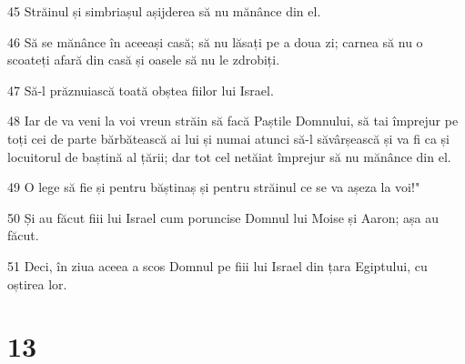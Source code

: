 \par 45 Străinul și simbriașul așijderea să nu mănânce din el.
\par 46 Să se mănânce în aceeași casă; să nu lăsați pe a doua zi; carnea să nu o scoateți afară din casă și oasele să nu le zdrobiți.
\par 47 Să-l prăznuiască toată obștea fiilor lui Israel.
\par 48 Iar de va veni la voi vreun străin să facă Paștile Domnului, să tai împrejur pe toți cei de parte bărbătească ai lui și numai atunci să-l săvârșească și va fi ca și locuitorul de baștină al țării; dar tot cel netăiat împrejur să nu mănânce din el.
\par 49 O lege să fie și pentru băștinaș și pentru străinul ce se va așeza la voi!"
\par 50 Și au făcut fiii lui Israel cum poruncise Domnul lui Moise și Aaron; așa au făcut.
\par 51 Deci, în ziua aceea a scos Domnul pe fiii lui Israel din țara Egiptului, cu oștirea lor.

\chapter{13}

